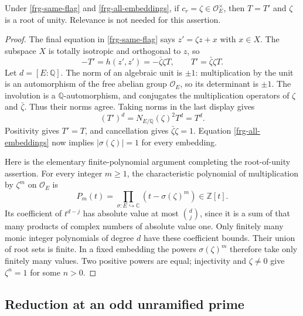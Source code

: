 \begin{proposition}\label{frg-unit-norm-root}
Under \eqref{frg-same-flag} and \eqref{frg-all-embeddings},
if $c_r=\zeta\in\mathcal O_E^\times$, then $T=T'$ and
$\zeta$ is a root of unity. Relevance is not needed for this
assertion.
\end{proposition}
\begin{proof}
The final equation in \eqref{frg-same-flag} says
$z'=\zeta z+x$ with $x\in X$. The subspace $X$ is
totally isotropic and orthogonal to $z$, so
\[
                 -T'=h(z',z')=-\bar\zeta\zeta T,
 \qquad T'=\bar\zeta\zeta T.
\]
Let $d=[E:\mathbb Q]$. The norm of an algebraic unit is
$\pm1$: multiplication by the unit is an automorphism of
the free abelian group $\mathcal O_E$, so its determinant
is $\pm1$. The involution is a $\mathbb Q$-automorphism,
and conjugates the multiplication operators of $\zeta$
and $\bar\zeta$. Thus their norms agree. Taking norms in
the last display gives
\[
                 (T')^d=N_{E/\mathbb Q}(\zeta)^2T^d=T^d.
\]
Positivity gives $T'=T$, and cancellation gives
$\bar\zeta\zeta=1$. Equation \eqref{frg-all-embeddings}
now implies $|\sigma(\zeta)|=1$ for every embedding.

Here is the elementary finite-polynomial argument completing
the root-of-unity assertion. For every integer $m\ge1$,
the characteristic polynomial of multiplication by $\zeta^m$
on $\mathcal O_E$ is
\[
                P_m(t)=\prod_{\sigma:E\hookrightarrow\mathbb C}
                                  (t-\sigma(\zeta)^m)\in\mathbb Z[t].
\]
Its coefficient of $t^{d-j}$ has absolute value at most
$\binom dj$, since it is a sum of that many products of
complex numbers of absolute value one. Only finitely many
monic integer polynomials of degree $d$ have these coefficient
bounds. Their union of root sets is finite. In a fixed
embedding the powers $\sigma(\zeta)^m$ therefore take only
finitely many values. Two positive powers are equal;
injectivity and $\zeta\ne0$ give $\zeta^n=1$ for some
$n>0$.
\end{proof}

\subsection{Reduction at an odd unramified prime}

